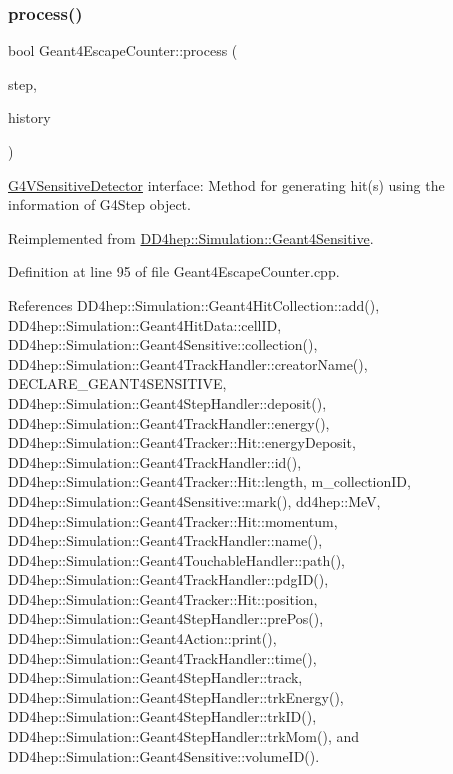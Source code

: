 \subsubsection{\texorpdfstring{process()}{process()}}
{\footnotesize\ttfamily bool Geant4\+Escape\+Counter\+::process (\begin{DoxyParamCaption}\item[{G4\+Step $\ast$}]{step,  }\item[{G4\+Touchable\+History $\ast$}]{history }\end{DoxyParamCaption})\hspace{0.3cm}{\ttfamily [virtual]}}



\hyperlink{class_g4_v_sensitive_detector}{G4\+V\+Sensitive\+Detector} interface\+: Method for generating hit(s) using the information of G4\+Step object. 



Reimplemented from \hyperlink{class_d_d4hep_1_1_simulation_1_1_geant4_sensitive_a9a9463a6c29a66dad43a52ffc9f7838d}{D\+D4hep\+::\+Simulation\+::\+Geant4\+Sensitive}.



Definition at line 95 of file Geant4\+Escape\+Counter.\+cpp.



References D\+D4hep\+::\+Simulation\+::\+Geant4\+Hit\+Collection\+::add(), D\+D4hep\+::\+Simulation\+::\+Geant4\+Hit\+Data\+::cell\+ID, D\+D4hep\+::\+Simulation\+::\+Geant4\+Sensitive\+::collection(), D\+D4hep\+::\+Simulation\+::\+Geant4\+Track\+Handler\+::creator\+Name(), D\+E\+C\+L\+A\+R\+E\+\_\+\+G\+E\+A\+N\+T4\+S\+E\+N\+S\+I\+T\+I\+VE, D\+D4hep\+::\+Simulation\+::\+Geant4\+Step\+Handler\+::deposit(), D\+D4hep\+::\+Simulation\+::\+Geant4\+Track\+Handler\+::energy(), D\+D4hep\+::\+Simulation\+::\+Geant4\+Tracker\+::\+Hit\+::energy\+Deposit, D\+D4hep\+::\+Simulation\+::\+Geant4\+Track\+Handler\+::id(), D\+D4hep\+::\+Simulation\+::\+Geant4\+Tracker\+::\+Hit\+::length, m\+\_\+collection\+ID, D\+D4hep\+::\+Simulation\+::\+Geant4\+Sensitive\+::mark(), dd4hep\+::\+MeV, D\+D4hep\+::\+Simulation\+::\+Geant4\+Tracker\+::\+Hit\+::momentum, D\+D4hep\+::\+Simulation\+::\+Geant4\+Track\+Handler\+::name(), D\+D4hep\+::\+Simulation\+::\+Geant4\+Touchable\+Handler\+::path(), D\+D4hep\+::\+Simulation\+::\+Geant4\+Track\+Handler\+::pdg\+I\+D(), D\+D4hep\+::\+Simulation\+::\+Geant4\+Tracker\+::\+Hit\+::position, D\+D4hep\+::\+Simulation\+::\+Geant4\+Step\+Handler\+::pre\+Pos(), D\+D4hep\+::\+Simulation\+::\+Geant4\+Action\+::print(), D\+D4hep\+::\+Simulation\+::\+Geant4\+Track\+Handler\+::time(), D\+D4hep\+::\+Simulation\+::\+Geant4\+Step\+Handler\+::track, D\+D4hep\+::\+Simulation\+::\+Geant4\+Step\+Handler\+::trk\+Energy(), D\+D4hep\+::\+Simulation\+::\+Geant4\+Step\+Handler\+::trk\+I\+D(), D\+D4hep\+::\+Simulation\+::\+Geant4\+Step\+Handler\+::trk\+Mom(), and D\+D4hep\+::\+Simulation\+::\+Geant4\+Sensitive\+::volume\+I\+D().




